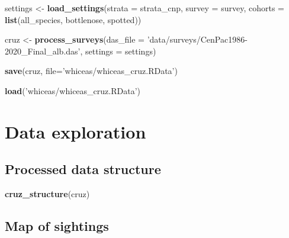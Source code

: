\documentclass[
]{book}
\newenvironment{Shaded}{\begin{snugshade}}{\end{snugshade}}
\newcommand{\DataTypeTok}[1]{\textcolor[rgb]{0.13,0.29,0.53}{#1}}
\newcommand{\KeywordTok}[1]{\textcolor[rgb]{0.13,0.29,0.53}{\textbf{#1}}}
\newcommand{\NormalTok}[1]{#1}
\newcommand{\StringTok}[1]{\textcolor[rgb]{0.31,0.60,0.02}{#1}}
\begin{document}
\begin{Shaded}
\begin{Highlighting}[]
\NormalTok{settings <-}\StringTok{ }\KeywordTok{load_settings}\NormalTok{(}\DataTypeTok{strata =}\NormalTok{ strata_cnp,}
                          \DataTypeTok{survey =}\NormalTok{ survey,}
                          \DataTypeTok{cohorts =} \KeywordTok{list}\NormalTok{(all_species,}
\NormalTok{                                         bottlenose,}
\NormalTok{                                         spotted))}

\NormalTok{cruz <-}\StringTok{ }
\StringTok{  }\KeywordTok{process_surveys}\NormalTok{(}\DataTypeTok{das_file =} \StringTok{'data/surveys/CenPac1986-2020_Final_alb.das'}\NormalTok{,}
                  \DataTypeTok{settings =}\NormalTok{ settings) }

\KeywordTok{save}\NormalTok{(cruz, }\DataTypeTok{file=}\StringTok{'whiceas/whiceas_cruz.RData'}\NormalTok{)}
\end{Highlighting}
\end{Shaded}

\begin{Shaded}
\begin{Highlighting}[]
\KeywordTok{load}\NormalTok{(}\StringTok{'whiceas/whiceas_cruz.RData'}\NormalTok{)}
\end{Highlighting}
\end{Shaded}

\hypertarget{data-exploration}{%
\section*{Data exploration}\label{data-exploration}}

\hypertarget{processed-data-structure}{%
\subsection*{Processed data structure}\label{processed-data-structure}}

\begin{Shaded}
\begin{Highlighting}[]
\KeywordTok{cruz_structure}\NormalTok{(cruz)}
\end{Highlighting}
\end{Shaded}

\hypertarget{map-of-sightings}{%
\subsection*{Map of sightings}\label{map-of-sightings}}
\end{document}
